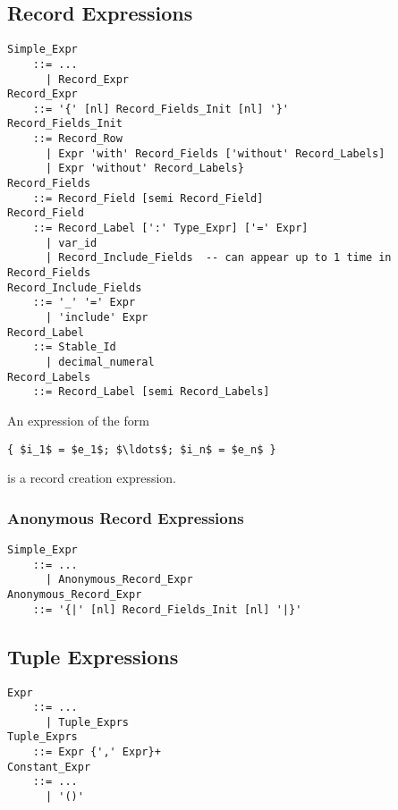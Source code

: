 \subsection{Record Expressions}
\label{sec:record-expressions}

\grammar\begin{lstlisting}
Simple_Expr
    ::= ...
      | Record_Expr
Record_Expr 
    ::= '{' [nl] Record_Fields_Init [nl] '}'
Record_Fields_Init
    ::= Record_Row
      | Expr 'with' Record_Fields ['without' Record_Labels]
      | Expr 'without' Record_Labels}
Record_Fields
    ::= Record_Field [semi Record_Field]
Record_Field
    ::= Record_Label [':' Type_Expr] ['=' Expr]
      | var_id
      | Record_Include_Fields  -- can appear up to 1 time in Record_Fields
Record_Include_Fields
    ::= '_' '=' Expr
      | 'include' Expr
Record_Label
    ::= Stable_Id
      | decimal_numeral
Record_Labels
    ::= Record_Label [semi Record_Labels]
\end{lstlisting}

An expression of the form
\begin{lstlisting}
{ $i_1$ = $e_1$; $\ldots$; $i_n$ = $e_n$ }
\end{lstlisting}
is a record creation expression. 





\subsubsection{Anonymous Record Expressions}
\label{sec:anonymous-record-expressions}

\grammar\begin{lstlisting}
Simple_Expr
    ::= ...
      | Anonymous_Record_Expr
Anonymous_Record_Expr
    ::= '{|' [nl] Record_Fields_Init [nl] '|}'
\end{lstlisting}





\subsection{Tuple Expressions}
\label{sec:tuples}

\grammar\begin{lstlisting}
Expr
    ::= ...
      | Tuple_Exprs
Tuple_Exprs 
    ::= Expr {',' Expr}+
Constant_Expr 
    ::= ...
      | '()'
\end{lstlisting}

